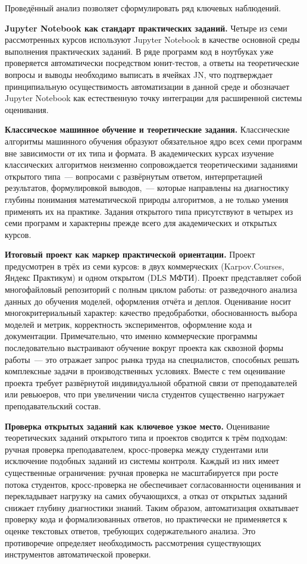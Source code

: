 Проведённый анализ позволяет сформулировать ряд ключевых наблюдений.

\textbf{Jupyter Notebook как стандарт практических заданий.}
Четыре из семи рассмотренных курсов используют Jupyter Notebook
в качестве основной среды выполнения практических заданий.
В ряде программ код в ноутбуках уже проверяется автоматически
посредством юнит-тестов, а ответы на теоретические вопросы и выводы
необходимо выписать в ячейках JN, что подтверждает принципиальную
осуществимость автоматизации в данной среде и обозначает Jupyter Notebook
как естественную точку интеграции для расширенной системы оценивания.

\textbf{Классическое машинное обучение и теоретические задания.}
Классические алгоритмы машинного обучения образуют обязательное ядро
всех семи программ вне зависимости от их типа и формата.
В академических курсах изучение классических алгоритмов неизменно
сопровождается теоретическими заданиями открытого типа~---
вопросами с развёрнутым ответом, интерпретацией результатов,
формулировкой выводов,~--- которые направлены на диагностику
глубины понимания математической природы алгоритмов,
а не только умения применять их на практике.
Задания открытого типа присутствуют в четырех из семи программ
и характерны прежде всего для академических и открытых курсов.

\textbf{Итоговый проект как маркер практической ориентации.}
Проект предусмотрен в трёх из семи курсов: в двух коммерческих
(Karpov.Courses, Яндекс Практикум) и одном открытом (DLS МФТИ).
Проект представляет собой многофайловый репозиторий с полным
циклом работы: от разведочного анализа данных до обучения моделей,
оформления отчёта и деплоя. Оценивание носит многокритериальный характер:
качество предобработки, обоснованность выбора моделей и метрик,
корректность экспериментов, оформление кода и документации.
Примечательно, что именно коммерческие программы последовательно
выстраивают обучение вокруг проекта как сквозной формы работы~---
это отражает запрос рынка труда на специалистов, способных решать
комплексные задачи в производственных условиях.
Вместе с тем оценивание проекта требует развёрнутой
индивидуальной обратной связи от преподавателей или ревьюеров,
что при увеличении числа студентов существенно нагружает
преподавательский состав.

\textbf{Проверка открытых заданий как ключевое узкое место.}
Оценивание теоретических заданий открытого типа и проектов сводится
к трём подходам: ручная проверка преподавателем,
кросс-проверка между студентами или исключение подобных заданий
из системы контроля.
Каждый из них имеет существенные ограничения:
ручная проверка не масштабируется при росте потока студентов,
кросс-проверка не обеспечивает согласованности оценивания
и перекладывает нагрузку на самих обучающихся,
а отказ от открытых заданий снижает глубину диагностики знаний.
Таким образом, автоматизация охватывает проверку кода
и формализованных ответов, но практически не применяется
к оценке текстовых ответов, требующих содержательного анализа.
Это противоречие определяет необходимость рассмотрения
существующих инструментов автоматической проверки.

